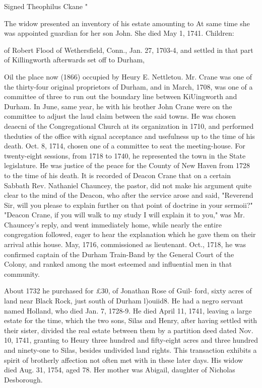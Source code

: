 \documentclass{book}
\begin{document}
Signed Theophilus Ckane " 

The widow presented an inventory of his estate amounting to 
At same time she was appointed guardian for her son John. She 
died May 1, 1741. Children: 








of Robert Flood of Wethersfield, Conn., Jan. 27, 1703-4, and 
settled in that part of Killingworth afterwards set off to Durham, 




Oil the place now (1866) occupied by Heury E. Nettletou. Mr. 
Crane was one of the thirty-four original proprietors of Durham, 
and in March, 1708, was one of a committee of three to run out 
the boundary line between KiUingworth and Durham. In June, 
same year, he with his brother John Crane were on the committee 
to adjust the laud claim between the said towns. He was chosen 
deaecni of the Congregational Church at its organization in 1710, 
and performed theduties of the office with signal acceptance and 
usefulness up to the time of his death. Oct. 8, 1714, chosen one 
of a committee to seat the meeting-house. For twenty-eight 
sessions, from 1718 to 1740, he represented the town in the State 
legislature. He was justice of the peace for the County of New 
Haven from 1728 to the time of his death. It is recorded of 
Deacon Crane that on a certain Sabbath Rev. Nathaniel Chauncey, 
the pastor, did not make his argument quite clear to the mind of 
the Deacon, who after the service arose and said, "Reverend Sir, 
will you please to explain further on that point of doctrine in 
your sermoii?" "Deacon Crane, if you will walk to my study I 
will explain it to you," was Mr. Chauncey's reply, and went 
immediately home, while nearly the entire congregation followed, 
eager to hear the explanation which he gave them on their arrival 
athis house. May, 1716, commissioned as lieutenant. Oct., 
1718, he was confirmed captain of the Durham Train-Band by the 
General Court of the Colony, and ranked among the most esteemed 
and influential men in that community. 

About 1732 he purchased for £30, of Jonathan Rose of Guil- 
ford, sixty acres of land near Black Rock, just south of Durham 
l)ouiid8. He had a negro servant named Holland, who died Jan. 
7, 1728-9. He died April 11, 1741, leaving a large estate for 
the time, which the two sons, Silas and Henry, after having 
settled with their sister, divided the real estate between them by 
a partition deed dated Nov. 10, 1741, granting to Heury three 
hundred and fifty-eight acres and three hundred and ninety-one 
to Silas, besides undivided land rights. This transaction exhibits 
a spirit of brotherly affection not often met with in these later 
days. His widow died Aug. 31, 1754, aged 78. Her mother 
was Abigail, daughter of Nicholas Desborough. 
\end{document}
